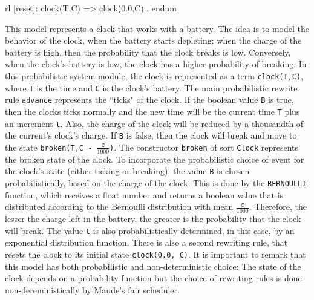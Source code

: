 \begin{example}
\begin{maude}[mathescape=true]
  rl [reset]: clock(T,C) => clock(0.0,C) .
endpm
\end{maude}
This model represents a clock that works with a battery. The idea is to model the behavior of the clock, when the battery starts depleting: when the charge of the battery is high, then the probability that the clock breaks is low. Conversely, when the clock's battery is low, the clock has a higher probability of breaking. In this probabilistic system module, the clock is represented as a term \texttt{clock(T,C)}, where \texttt{T} is the time and \texttt{C} is the clock's battery. The main probabilistic rewrite rule \texttt{advance} represents the ``ticks" of the clock. If the boolean value \texttt{B} is true, then the clocks ticks normally and the new time will be the current time \texttt{T} plus an increment \texttt{t}. Also, the charge of the clock will be reduced by a thousandth of the current's clock's charge. If \texttt{B} is false, then the clock will break and move to the state \texttt{broken(T,C - $\frac{\texttt{C}}{1000}$)}. The constructor \texttt{broken} of sort \texttt{Clock} represents the broken state of the clock. To incorporate the probabilistic choice of event for the clock's state (either ticking or breaking), the value \texttt{B} is chosen probabilistically, based on the charge of the clock. This is done by the \texttt{BERNOULLI} function, which receives a float number and returns a boolean value that is distributed according to the Bernoulli distribution with mean $\frac{\texttt{C}}{1000}$. Therefore, the lesser the charge left in the battery, the greater is the probability that the clock will break. The value \texttt{t} is also probabilistically determined, in this case, by an exponential distribution function.
There is also a second rewriting rule, that resets the clock to its initial state \texttt{clock(0.0, C)}. It is important to remark that this model has both probabilistic and non-deterministic choice: The state of the clock depends on a probability function but the choice of rewriting rules is done non-dereministically by Maude's fair scheduler.
\end{example}


